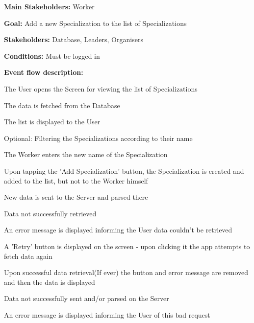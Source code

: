 				\noindent {}
				\begin{packed_item}
					\item \textbf{Main Stakeholders:} Worker
					\item \textbf{Goal:} Add a new Specialization to the list of Specializations
					\item \textbf{Stakeholders: } Database, Leaders, Organisers
					\item \textbf{Conditions: } Must be logged in
					\item \textbf{Event flow description: }
					\begin{packed_enum}
						\item The User opens the Screen for viewing the list of Specializations
						\item The data is fetched from the Database
						\item The list is displayed to the User
						\item Optional: Filtering the Specializations according to their name
						\item The Worker enters the new name of the Specialization
						\item Upon tapping the 'Add Specialization' button, the Specialization is created and added to the list, but not to the Worker himself
						\item New data is sent to the Server and parsed there
					\end{packed_enum}
					
					\begin{packed_item}
						\item[1.a] Data not successfully retrieved
						\item[] \begin{packed_enum}
							\item An error message is displayed informing the User data couldn't be retrieved
							\item A 'Retry' button is displayed on the screen - upon clicking it the app attempts to fetch data again
							\item Upon successful data retrieval(If ever) the button and error message are removed and then the data is displayed
						\end{packed_enum}
						
						\item[6.a] Data not successfully sent and/or parsed on the Server
						\item[] \begin{packed_enum}
							\item An error message is displayed informing the User of this bad request
						\end{packed_enum}
						

\end{packed_item}
\end{packed_item}
